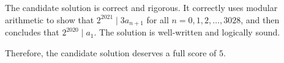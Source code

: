 The candidate solution is correct and rigorous. It correctly uses modular arithmetic to show that $2^{2021} \mid 3a_{n+1}$ for all $n = 0, 1, 2, \dots, 3028$, and then concludes that $2^{2020} \mid a_1$. The solution is well-written and logically sound.

Therefore, the candidate solution deserves a full score of $\boxed{5}$.
